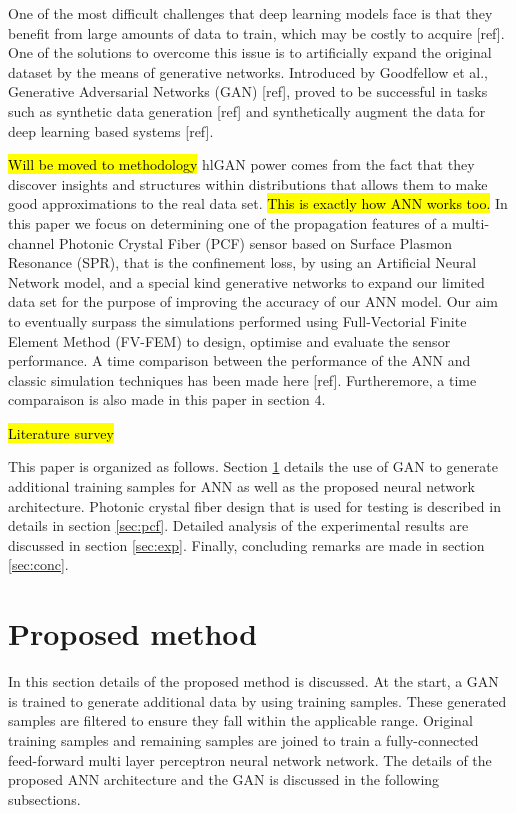 \documentclass[draft, a4, 10pt, onecolumn]{IEEEtran}
\begin{document}
One of the most difficult challenges that deep learning models face is that they benefit from large amounts of data to train, which may be costly to acquire [ref]. One of the solutions to overcome this issue is to artificially expand the original dataset by the means of generative networks. Introduced by Goodfellow et al., Generative Adversarial Networks (GAN) [ref], proved to be successful in tasks such as synthetic data generation [ref] and synthetically augment the data for deep learning based systems [ref]. 

\hl{Will be moved to methodology} 
hl{GAN power comes from the fact that they discover insights and structures within distributions that allows them to make good approximations to the real data set.} \hl{This is exactly how ANN works too.} In this paper we focus on determining one of the propagation features of a multi-channel Photonic Crystal Fiber (PCF) sensor based on Surface Plasmon Resonance (SPR), that is the confinement loss, by using an Artificial Neural Network model, and a special kind generative networks to expand our limited data set for the purpose of  improving the accuracy of our ANN model. Our aim to eventually surpass the simulations performed using Full-Vectorial Finite Element Method (FV-FEM) to design, optimise and evaluate the sensor performance. A time comparison between the performance of the ANN and classic simulation techniques has been made here [ref]. Furtheremore, a time comparaison is also made in this paper in section $4$.

\hl{Literature survey}

This paper is organized as follows. Section \ref{sec:prop} details the use of GAN to generate additional training samples for ANN as well as the proposed neural network architecture. Photonic crystal fiber design that is used for testing is described in details in section \ref{sec:pcf}. Detailed analysis of the experimental results are discussed in section \ref{sec:exp}. Finally, concluding remarks are made in section \ref{sec:conc}.

\section{Proposed method}
\label{sec:prop}

In this section details of the proposed method is discussed. At the start, a GAN is trained to generate additional data by using training samples. These generated samples are filtered to ensure they fall within the applicable range. Original training samples and remaining samples are joined to train a fully-connected feed-forward multi layer perceptron neural network network. The details of the proposed ANN architecture and the GAN is discussed in the following subsections.
\end{document}

